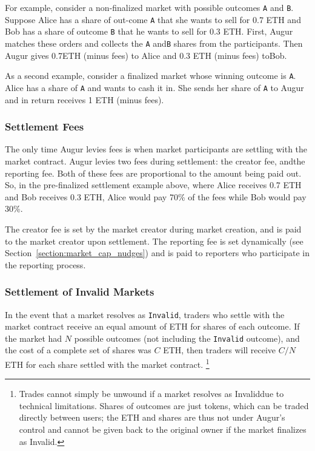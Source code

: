 \documentclass[12pt,floatfix,reprint,nofootinbib,amsmath,amssymb,epsfig,pre,floats,letterpaper,groupedaffiliation]{revtex4-1}
\theoremstyle{definition}
\theoremstyle{definition}
\begin{document}
For example, consider a non-finalized market with pos\-sible outcomes \texttt{A} and \texttt{B}. Suppose Alice has a share of out-\linebreak come \texttt{A} that she wants to sell for 0.7 ETH and Bob has a share of outcome \texttt{B} that he wants to sell for 0.3 ETH. First, Augur matches these orders and collects the \texttt{A} and\linebreak \texttt{B} shares from the participants. Then Augur gives 0.7\linebreak ETH (minus fees) to Alice and 0.3 ETH (minus fees) to\linebreak Bob.

As a second example, consider a finalized market whose winning outcome is \texttt{A}. Alice has a share of \texttt{A} and wants to cash it in. She sends her share of \texttt{A} to Augur and in return receives 1 ETH (minus fees).

\subsubsection{Settlement Fees}

The only time Augur levies fees is when market par\-ticipants are settling with the market contract. Augur levies two fees during settlement: the creator fee, and\linebreak the reporting fee. Both of these fees are proportional to the amount being paid out. So, in the pre-finalized settlement example above, where Alice receives 0.7 ETH and Bob receives 0.3 ETH, Alice would pay 70\% of the fees while Bob would pay 30\%.

The creator fee is set by the market creator during market creation, and is paid to the market creator upon settlement. The reporting fee is set dynamically (see Sec\-tion~\ref{section:market_cap_nudges}) and is paid to reporters who participate in the reporting process.

\subsubsection{Settlement of Invalid Markets}

In the event that a market resolves as \texttt{Invalid}, traders who settle with the market contract receive an equal amount of ETH for shares of each outcome. If the market had $N$ possible outcomes (not including the \texttt{Invalid} outcome), and the cost of a complete set of shares was $C$ ETH, then traders will receive $C/N$ ETH for each share settled with the market contract.
\footnote{Trades cannot simply be unwound if a market resolves as Invalid\linebreak due to technical limitations. Shares of outcomes are just tokens, which can be traded directly between users; the ETH and shares are thus not under Augur's control and cannot be given back to the original owner if the market finalizes as Invalid.}
\end{document}
